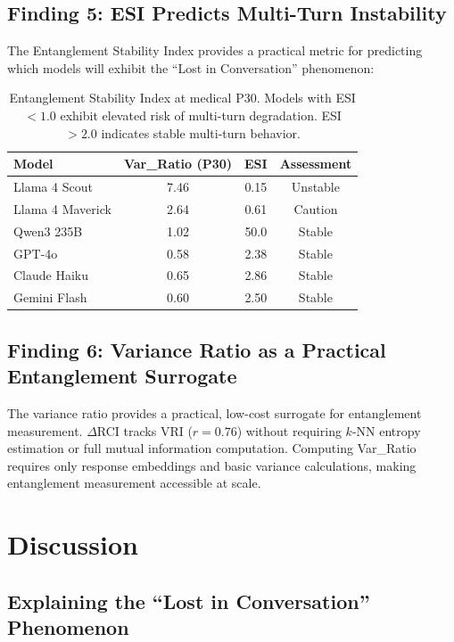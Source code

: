 \documentclass[twoside,11pt]{article}
\begin{document}
\subsection{Finding 5: ESI Predicts Multi-Turn Instability}

The Entanglement Stability Index provides a practical metric for predicting which models will exhibit the ``Lost in Conversation'' phenomenon:

\begin{table}[ht]
\centering
\begin{tabular}{lccc}
\toprule
\textbf{Model} & \textbf{Var\_Ratio (P30)} & \textbf{ESI} & \textbf{Assessment} \\
\midrule
Llama 4 Scout & 7.46 & 0.15 & Unstable \\
Llama 4 Maverick & 2.64 & 0.61 & Caution \\
Qwen3 235B & 1.02 & 50.0 & Stable \\
GPT-4o & 0.58 & 2.38 & Stable \\
Claude Haiku & 0.65 & 2.86 & Stable \\
Gemini Flash & 0.60 & 2.50 & Stable \\
\bottomrule
\end{tabular}
\caption{Entanglement Stability Index at medical P30. Models with ESI $< 1.0$ exhibit elevated risk of multi-turn degradation. ESI $> 2.0$ indicates stable multi-turn behavior.}
\label{tab:esi}
\end{table}

\subsection{Finding 6: Variance Ratio as a Practical Entanglement Surrogate}

The variance ratio provides a practical, low-cost surrogate for entanglement measurement. $\Delta$RCI tracks VRI ($r = 0.76$) without requiring $k$-NN entropy estimation or full mutual information computation. Computing Var\_Ratio requires only response embeddings and basic variance calculations, making entanglement measurement accessible at scale.

\section{Discussion}

\subsection{Explaining the ``Lost in Conversation'' Phenomenon}
\end{document}
